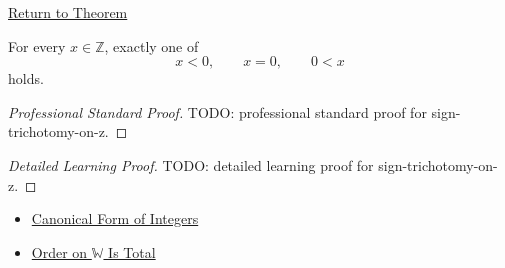 \newpage
{}
\label{prf:sign-trichotomy-on-z}

\begin{remark*}[Return]
\hyperref[thm:sign-trichotomy-on-z]{Return to Theorem}
\end{remark*}

\begin{theorem*}
For every $x\in\mathbb{Z}$, exactly one of
\[
x<0,\qquad x=0,\qquad 0<x
\]
holds.
\end{theorem*}

\begin{proof}[Professional Standard Proof]
\LRAProofBodyStart
TODO: professional standard proof for sign-trichotomy-on-z.
\end{proof}

\begin{proof}[Detailed Learning Proof]
\LRAProofBodyStart
TODO: detailed learning proof for sign-trichotomy-on-z.
\end{proof}

\begin{remark*}
\end{remark*}

\begin{dependencies}
\begin{itemize}
  \item \hyperref[thm:canonical-form-of-integers]{Canonical Form of Integers}
  \item \hyperref[thm:order-on-w-total]{Order on $\mathbb{W}$ Is Total}
\end{itemize}
\end{dependencies}

\clearpage

